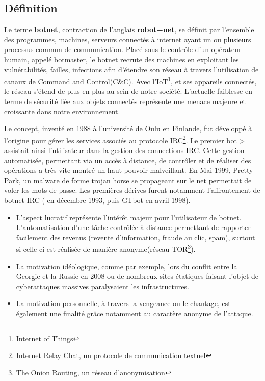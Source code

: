 \subsection{Définition}
\par
Le terme \textbf{botnet}, contraction de l'anglais \textbf{robot+net}, se définit par l'ensemble des programmes, machines, serveurs connectés à internet ayant un ou plusieurs processus commun de communication.
Placé sous le contrôle d'un opérateur humain, appelé botmaster, le botnet recrute des machines en exploitant les vulnérabilités, failles, infections afin d'étendre son réseau à travers l'utilisation de canaux de Command and Control(C\&C).
\newline Avec l'IoT\footnote{Internet of Things}, et ses appareils connectés, le réseau s'étend de plus en plus au sein de notre société. L'actuelle faiblesse en terme de sécurité liée aux objets connectés représente une menace majeure et croissante dans notre environnement.
\par
Le concept, inventé en 1988 à l'université de Oulu en Finlande, fut développé à l'origine pour gérer les services associés au protocole IRC\footnote{Internet Relay Chat, un protocole de communication textuel}.
\newline
Le premier bot > assistait ainsi l'utilisateur dans la gestion des connections IRC.
Cette gestion automatisée, permettant via un accès à distance, de contrôler et de réaliser des opérations a très vite montré un haut pouvoir malveillant.
\newline
En Mai 1999, Pretty Park, un malware de forme trojan horse se propageant sur le net permettait de voler les mots de passe.
\newline
Les premières dérives furent notamment l'affrontement de botnet IRC ( en décembre 1993, puis GTbot en avril 1998).
\begin{itemize}
	\item L'aspect lucratif représente l'intérêt majeur pour l'utilisateur de botnet. L'automatisation d'une tâche contrôlée à distance permettant de rapporter facilement des revenus (revente d'information, fraude au clic, spam), surtout si celle-ci est réalisée de manière anonyme(réseau TOR\footnote{The Onion Routing, un réseau d'anonymisation}).
	\item La motivation idéologique, comme par exemple, lors du conflit entre la Georgie et la Russie en 2008 ou de nombreux sites étatiques faisant l'objet de cyberattaques massives paralysaient les infrastructures.
	\item La motivation personnelle, à travers la vengeance ou le chantage, est également une finalité grâce notamment au caractère anonyme de l'attaque.
\end{itemize}


